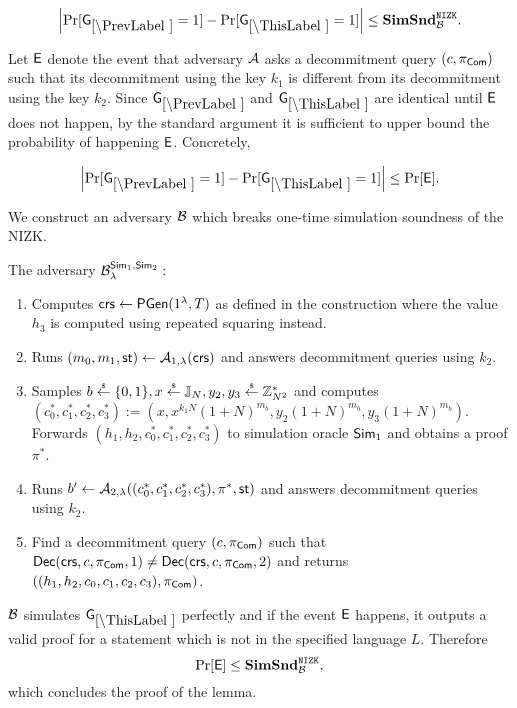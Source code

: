 \begin{lemma}
\[
\left|\Pr[\games_\prevgame = 1] - \Pr[\games_\thisgame = 1]\right| \leq \simsnd^\nizk_\advB. 
\]
\end{lemma}

Let $\mathsf{E}$ denote the event that adversary $\mathcal{A}$ asks a decommitment query $(c, \pi_{\mathsf{Com}})$ such that its decommitment using the key $k_1$ is different from its decommitment using the key $k_2$. Since $\games_\prevgame$ and $\games_\thisgame$ are identical until $\mathsf{E}$ does not happen, by the standard argument it is sufficient to upper bound the probability of happening $\mathsf{E}$. Concretely,  

\[
\left|\Pr[\games_\prevgame = 1] - \Pr[\games_\thisgame = 1]\right| \leq \Pr[\event]. 
\]

We construct an adversary $\mathcal{B}$ which breaks one-time simulation soundness of the NIZK. 

The adversary $\mathcal{B}_{\lambda}^{\mathsf{Sim}_1, \mathsf{Sim}_2}:$
\vspace{-2mm}
\begin{enumerate}
\item Computes $\mathsf{crs} \leftarrow \mathsf{PGen}(1{^{\lambda}}, T)$ as defined in the construction where the value $h_3$ is computed using repeated squaring instead.
\item Runs $(m_0, m_1, \mathsf{st}) \leftarrow \mathcal{A}_{1, \lambda}(\mathsf{crs})$ and answers decommitment queries using $k_2$.
\item Samples $b \stackrel{{\scriptscriptstyle\$}}{\leftarrow} \{0,1\}, x \stackrel{{\scriptscriptstyle\$}}{\leftarrow} \mathbb{J}_N, y_2, y_3 \stackrel{{\scriptscriptstyle\$}}{\leftarrow} \mathbb{Z}_{N^2}^*$ and computes $(c_0^*, c_1^*, c_2^*, c_3^*):=(x, x^{k_1 N} (1+N)^{m_b}, y_2 (1+N)^{m_b}, y_3 (1+N)^{m_b})$. Forwards $(h_1, h_2, c_0^*, c_1^*, c_2^*, c_3^*)$ to simulation oracle $\mathsf{Sim}_1$ and obtains a proof $\pi^*$.
\item Runs $b' \leftarrow \mathcal{A}_{2, \lambda}((c_0^*, c_1^*, c_2^*, c_3^*), \pi^*, \mathsf{st})$ and answers decommitment queries using $k_2$.
\item Find a decommitment query $(c, \pi_{\mathsf{Com}})$ such that $\mathsf{Dec}(\mathsf{crs}, c, \pi_{\mathsf{Com}}, 1) \neq \allowbreak \mathsf{Dec}(\mathsf{crs},c, \pi_{\mathsf{Com}}, 2)$ and returns $((h_1, h_2, c_0, c_1, c_2, c_3), \pi_{\mathsf{Com}})$.
\end{enumerate}

$\mathcal{B}$ simulates $\games_\thisgame$ perfectly and if the event $\mathsf{E}$ happens, it outputs a valid proof for a statement which is not in the specified language $L$. Therefore
\[\Pr[\mathsf{E}] \leq \mathbf{SimSnd}^{\mathtt{NIZK}}_{\mathcal{B}},\]
which concludes the proof of the lemma.  

%
%
%

